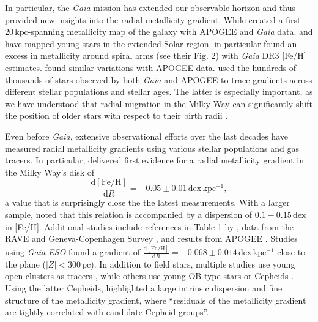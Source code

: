 \documentclass[fleqn,usenatbib]{mnras}
\begin{document}
In particular, the \textit{Gaia} mission \citep{Gaia-Collaboration2016} has extended our observable horizon and thus provided new insights into the radial metallicity gradient. While \citet[][see their Fig. 6]{Hogg2019} created a first $20\,\mathrm{kpc}$-spanning metallicity map of the galaxy with APOGEE and \textit{Gaia} data. \citet{Zari2018, Zari2021} and \citet{Poggio2021, Poggio2022} have mapped young stars in the extended Solar region. \citet{Poggio2022} in particular found an excess in metallicity around spiral arms (see their Fig. 2) with \textit{Gaia} DR3 [Fe/H] estimates. \citet{Hackshaw2024} found similar variations with APOGEE data. \citet{Imig2023} used the hundreds of thousands of stars observed by both \textit{Gaia} and APOGEE to trace gradients across different stellar populations and stellar ages. The latter is especially important, as we have understood that radial migration in the Milky Way can significantly shift the position of older stars with respect to their birth radii \citet{Binney2008, Frankel2018, Frankel2020}.

Even before \textit{Gaia}, extensive observational efforts over the last decades have measured radial metallicity gradients using various stellar populations and gas tracers. In particular, \citet{Janes1979} delivered first evidence for a radial metallicity gradient in the Milky Way's disk of
\begin{equation}
    \frac{\mathrm{d{[Fe/H]}}}{\mathrm{d}R} = -0.05 \pm 0.01\,\mathrm{dex\,kpc^{-1}},
\end{equation}
a value that is surprisingly close the the latest measurements\citep{Anders2017, Hayden2015}. With a larger sample, \citet{Twarog1980} noted that this relation is accompanied by a dispersion of $0.1-0.15\,\mathrm{dex}$ in [Fe/H]. Additional studies include references in Table 1 by \citet{Chiappini2001}, data from the RAVE and Geneva-Copenhagen Survey \citep{Boeche2013}, and results from APOGEE \citep{Anders2014, Cunha2016}. Studies using \textit{Gaia-ESO} \citep{Bergemann2014} found a gradient of $\frac{\mathrm{d{[Fe/H]}}}{\mathrm{d}R} = -0.068 \pm 0.014\,\mathrm{dex\,kpc^{-1}}$ close to the plane ($\vert Z \vert < 300\,\mathrm{pc}$). In addition to field stars, multiple studies use young open clusters as tracers \citep[e.g.][]{Cunha2016, Magrini2017, Casamiquela2019, Donor2020, Spina2021,Myers2022}, while others use young OB-type stars \citep{Zari2018, Zari2021, Poggio2021, Poggio2022} or Cepheids \citep{Andrievsky2002, Andrievsky2002b, Lemasle2007, Lemasle2013}. Using the latter Cepheids, \citet{Genovali2014} highlighted a large intrinsic dispersion and fine structure of the metallicity gradient, where ``residuals of the metallicity gradient are tightly correlated with candidate Cepheid groups''.
\end{document}
